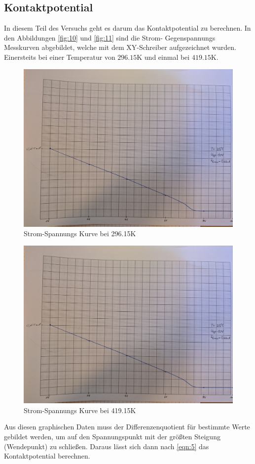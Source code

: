\subsection{Kontaktpotential}
In diesem Teil des Versuchs geht es darum das Kontaktpotential zu berechnen. 
In den Abbildungen \autoref{fig:10} und \autoref{fig:11} sind die Strom-
Gegenspannungs Messkurven abgebildet, welche mit dem XY-Schreiber 
aufgezeichnet wurden. Einersteits bei einer Temperatur von $296.15\unit{\kelvin}$
und einmal bei $419.15\unit{\kelvin}$.
\begin{figure}[H]
  \centering
  \includegraphics[width=0.7\linewidth]{Bilder/1.jpg}
  \caption{Strom-Spannungs Kurve bei 296.15\unit{\kelvin}}
  \label{fig:10}
\end{figure}

\begin{figure}[H]
  \centering
  \includegraphics[width=0.7\linewidth]{Bilder/1.jpg}
  \caption{Strom-Spannungs Kurve bei 419.15\unit{\kelvin}}
  \label{fig:11}
\end{figure}

\noindent Aus diesen graphischen Daten muss der Differenzenquotient für bestimmte
Werte gebildet werden, um auf den Spannungspunkt mit der größten Steigung 
(Wendepunkt) zu schließen. Daraus lässt sich dann nach \autoref{eqn:5} 
das Kontaktpotential berechnen.

